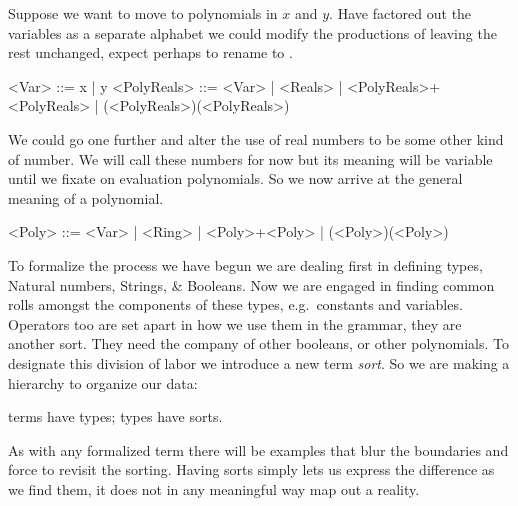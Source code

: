 Suppose we want to move to polynomials in $x$ and $y$.  Have factored out 
the variables as a separate alphabet we could modify the productions of 
 leaving the rest unchanged, expect perhaps to rename 
 to .
\begin{Gcode}[]
    <Var>  ::= x | y
    <PolyReals> ::= <Var>
            | <Reals>
            | <PolyReals>+<PolyReals>
            | (<PolyReals>)(<PolyReals>)
\end{Gcode}
We could go one further and alter the use of real numbers to be some other 
kind  of number.  We will call these numbers  for now but its 
meaning will be variable until we fixate on evaluation polynomials.
So we now arrive at the general meaning of a polynomial.
\begin{Gcode}[]
    <Poly> ::= <Var>
            | <Ring>
            | <Poly>+<Poly>
            | (<Poly>)(<Poly>)
\end{Gcode}



To formalize the process we have begun we are dealing first in defining types, 
Natural numbers, Strings, \& Booleans.  Now we are engaged in finding common rolls 
amongst the components of these types, e.g.\ constants and variables.
Operators too are set apart in how we use them in the grammar, they are another sort.  They 
need the company of other booleans, or other polynomials.
To designate this division of labor we introduce a new term \emph{sort}.
So we are making a hierarchy to organize our data:
\begin{center}
    terms have types;
    types have sorts.
\end{center}
As with any formalized term there will be examples that blur the boundaries and force 
to revisit the sorting.  Having sorts simply lets us express the difference as we 
find them, it does not in any meaningful way map out a reality.



